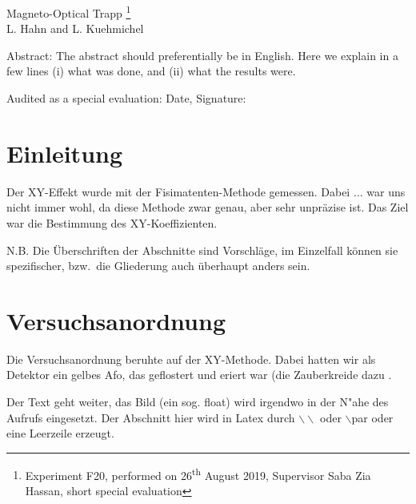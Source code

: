 \documentclass[12pt, a4paper]{article}
\begin{document}
\thispagestyle{empty}     %
\null\vspace{40mm}
\begin{center}
{%
\Large  Magneto-Optical Trapp
\footnote{\noindent Experiment F20, performed on 26\textsuperscript{th} August 2019,
Supervisor Saba Zia Hassan,
short special evaluation}
}\\[15mm]
L. Hahn and L. Kuehmichel

\vspace{25mm}

\parbox{0.9\textwidth}{
Abstract:    
\small The abstract should preferentially be in English. Here we explain in a
few lines (i) what was done, and (ii) what the results were.
}
\end{center}

\vfill
Audited as a special evaluation: Date, Signature:
\vspace{20mm}

\null\thispagestyle{empty} 
   

\newpage

\section{Einleitung}
Der XY-Effekt wurde mit der Fisimatenten-Methode gemessen. Dabei $\ldots$ 
war uns nicht immer wohl, da diese Methode zwar genau, aber sehr unpr\"azise 
ist. Das Ziel war die Bestimmung des XY-Koeffizienten. 

N.B. Die \"Uberschriften der Abschnitte sind Vorschl\"age, im Einzelfall 
k\"onnen sie spezifischer, bzw.\ 
die Gliederung auch \"uberhaupt anders sein.

\section{Versuchsanordnung}

Die Versuchsanordnung beruhte auf der XY-Methode. Dabei hatten wir als
Detektor ein gelbes Afo, das geflostert und eriert war \cite{afo} (die Zauberkreide dazu .

Der Text geht weiter, das Bild (ein sog. float) wird irgendwo in der N"ahe des
Aufrufs eingesetzt. Der Abschnitt hier wird in Latex durch 
$\backslash\backslash$ oder $\backslash$par
oder eine Leerzeile erzeugt.
\end{document}
